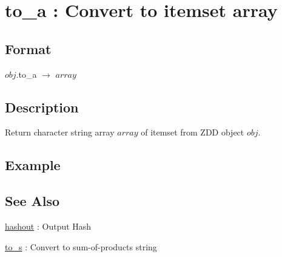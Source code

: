 
\section{to\_a : Convert to itemset array\label{sect:to_a}}
\subsection*{Format}
$obj$.to\_a $\rightarrow$ $array$

\subsection*{Description}
 Return character string array $array$ of itemset from ZDD object $obj$. 

\subsection*{Example}


\subsection*{See Also}
\hyperref[sect:hashout]{hashout} : Output Hash

\hyperref[sect:to_s]{to\_s} : Convert to sum-of-products string 

